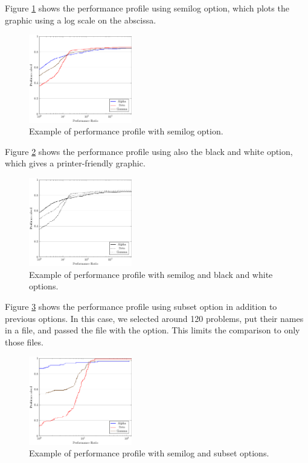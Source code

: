     Figure \ref{fig:example2} shows the performance profile using  semilog
    option, which plots the graphic using a log scale on the abscissa.
    \begin{figure}[!ht]
      \centering
      \includegraphics[width=0.4\textwidth]{plots/abc-semilog.pdf}
      \caption{Example of performance profile with semilog option.}
      \label{fig:example2}
    \end{figure}
    Figure \ref{fig:example3} shows the performance profile using also the black
    and white option, which gives a printer-friendly graphic.
    \begin{figure}[!ht]
      \centering
      \includegraphics[width=0.4\textwidth]{plots/abc-semilog-bw.pdf}
      \caption{Example of performance profile with semilog and black and white
        options.}
      \label{fig:example3}
    \end{figure}
    Figure \ref{fig:example4} shows the performance profile using  subset
    option in addition to previous options. In this case, we selected around 120
    problems, put their names in a file, and passed the file with the option.
    This limits the comparison to only those files.
    \begin{figure}[!ht]
      \centering
      \includegraphics[width=0.4\textwidth]{plots/abc-semilog-hs.pdf}
      \caption{Example of performance profile with semilog and subset options.}
      \label{fig:example4}
    \end{figure}


